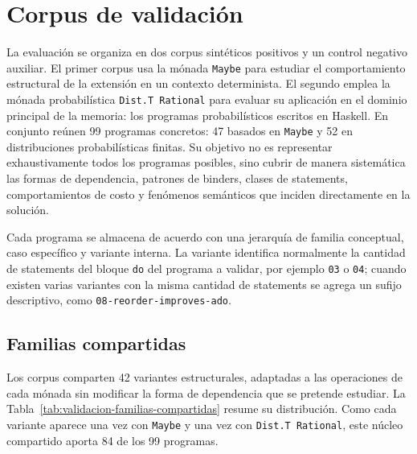 
\section{Corpus de validación}
\label{sec:validacion-corpus}

La evaluación se organiza en dos corpus sintéticos positivos y un control negativo auxiliar. El primer corpus usa la mónada \texttt{Maybe} para estudiar el comportamiento estructural de la extensión en un contexto determinista. El segundo emplea la mónada probabilística \texttt{Dist.T Rational} para evaluar su aplicación en el dominio principal de la memoria: los programas probabilísticos escritos en \textsf{Haskell}. En conjunto reúnen 99 programas concretos: 47 basados en \texttt{Maybe} y 52 en distribuciones probabilísticas finitas. Su objetivo no es representar exhaustivamente todos los programas posibles, sino cubrir de manera sistemática las formas de dependencia, patrones de binders, clases de statements, comportamientos de costo y fenómenos semánticos que inciden directamente en la solución.

Cada programa se almacena de acuerdo con una jerarquía de familia conceptual, caso específico y variante interna. La variante identifica normalmente la cantidad de statements del bloque \texttt{do} del programa a validar, por ejemplo \texttt{03} o \texttt{04}; cuando existen varias variantes con la misma cantidad de statements se agrega un sufijo descriptivo, como \texttt{08-reorder-improves-ado}.

\subsection{Familias compartidas}

Los corpus comparten 42 variantes estructurales, adaptadas a las operaciones de cada mónada sin modificar la forma de dependencia que se pretende estudiar. La Tabla~\ref{tab:validacion-familias-compartidas} resume su distribución. Como cada variante aparece una vez con \texttt{Maybe} y una vez con \texttt{Dist.T Rational}, este núcleo compartido aporta 84 de los 99 programas.

